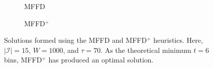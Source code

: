 \documentclass[authoryear]{elsarticle}
\begin{document}
\begin{figure}[H]	
	\centering
	\begin{subfigure}[h]{0.33\textwidth}
		
		\caption{MFFD}
		\label{fig:mffd}
	\end{subfigure} \hspace{15mm}
	\begin{subfigure}[h]{0.33\textwidth}
		
		\caption{MFFD$^+$}
		\label{fig:mffdplus}
	\end{subfigure}
	\caption{Solutions formed using the MFFD and MFFD$^+$ heuristics. Here, $|\mathcal{I}| = 15$, $W = 1000$, and $\tau = 70$. As the theoretical minimum $t = 6$ bins, MFFD$^+$ has produced an optimal solution.}
	\label{fig:mffdvsmffdplus}
\end{figure}
\end{document}
